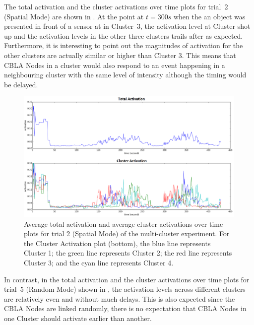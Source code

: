 The total activation and the cluster activations over time plots for trial~2 (Spatial Mode) are shown in . At the point at $t = 300s$ when the an object was presented in front of a sensor at in Cluster~3, the activation level at Cluster shot up and the activation levels in the other three clusters trails after as expected. Furthermore, it is interesting to point out the magnitudes of activation for the other clusters are actually similar or higher than Cluster 3. This means that CBLA Nodes in a cluster would also respond to an event happening in a neighbouring cluster with the same level of intensity although the timing would be delayed.

\begin{figure} [!htb]
	\centering
	\includegraphics[width=1.0\textwidth]{"fig/validations/cbla_spatial_global_2015-11-16_14-33-11 - Metrics"}
	\caption[Average total activation and average cluster activations over time plots for trial 2 (Spatial Mode) of the multi-cluster experiment]{Average total activation and average cluster activations over time plots for trial 2 (Spatial Mode) of the multi-cluster experiment. For the Cluster Activation plot (bottom), the blue line represents Cluster 1; the green line represents Cluster 2; the red line represents Cluster 3; and the cyan line represents Cluster 4.}
	\label{fig:multi-cluster-results-spatial-2}
\end{figure}

In contrast, in the total activation and the cluster activations over time plots for trial~5 (Random Mode) shown in , the activation levels across different clusters are relatively even and without much delays. This is also expected since the CBLA Nodes are linked randomly, there is no expectation that CBLA Nodes in one Cluster should activate earlier than another.

